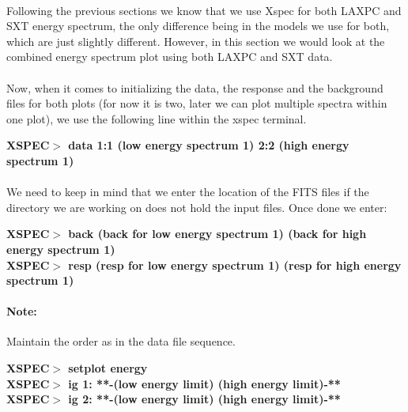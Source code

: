 \documentclass[a4paper,twoside]{report}
\numberwithin{equation}{section}
\begin{document}
\paragraph{}
Following the previous sections we know that we use Xspec for both LAXPC and SXT energy spectrum, the only difference being in the models we use for both, which are just slightly different. However, in this section we would look at the combined energy spectrum plot using both LAXPC and SXT data. 
\paragraph{}
Now, when it comes to initializing the data, the response and the background files for both plots (for now it is two, later we can plot multiple spectra within one plot), we use the following line within the xspec terminal.
\begin{center}
\textbf{XSPEC$>$ data 1:1 (low energy spectrum 1) 2:2 (high energy spectrum 1)}
\end{center}
\paragraph{}
We need to keep in mind that we enter the location of the FITS files if the directory we are working on does not hold the input files. Once done we enter:
\begin{center}
\textbf{XSPEC$>$ back (back for low energy spectrum 1) (back for high energy spectrum 1)} \\
\textbf{XSPEC$>$ resp (resp for low energy spectrum 1) (resp for high energy spectrum 1)} \\ 
\end{center}
\paragraph{Note:} Maintain the order as in the data file sequence.
\begin{center}
\textbf{XSPEC$>$ setplot energy} \\
\textbf{XSPEC$>$ ig 1: **-(low energy limit) (high energy limit)-**} \\
\textbf{XSPEC$>$ ig 2: **-(low energy limit) (high energy limit)-**}
\end{center}
\end{document}
